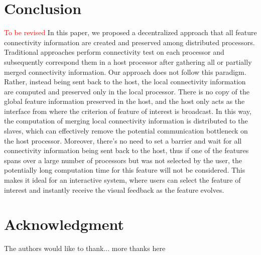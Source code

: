 \documentclass[10pt, conference, compsocconf]{IEEEtran}
\begin{document}
\section{Conclusion}
\textcolor{red}{To be revised}
In this paper, we proposed a decentralized approach that all feature connectivity information are created and preserved among distributed processors. Traditional approaches perform connectivity test on each processor and subsequently correspond them in a host processor after gathering all or partially merged connectivity information. Our approach does not follow this paradigm. Rather, %
instead being sent back to the host, the local connectivity information are computed and preserved only in the local processor. 
There is no copy of the global feature information preserved in the host, and the host only acts as the interface from where the criterion of feature of interest is broadcast. In this way, the computation of merging local connectivity information is distributed to the slaves, which can effectively remove the potential communication bottleneck on the host processor. 
Moreover, there's no need to set a barrier and wait for all connectivity information being sent back to the host, thus if one of the features spans over a large number of processors but was not selected by the user, the potentially long computation time for this feature will not be considered. This makes it ideal for an interactive system, where users can select the feature of interest and instantly receive the visual feedback as the feature evolves.

\section*{Acknowledgment}
The authors would like to thank...
more thanks here





\end{document}
